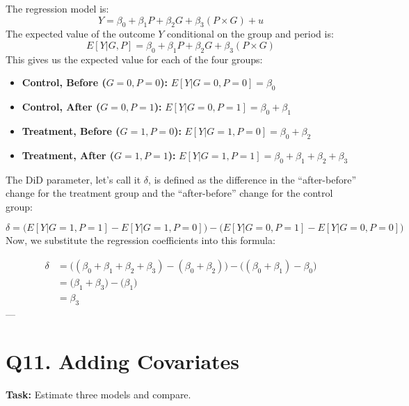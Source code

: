 \documentclass[
]{article}
\providecommand{\tightlist}{%
  \setlength{\itemsep}{0pt}\setlength{\parskip}{0pt}}
\begin{document}
The regression model is: \[
Y = \beta_0 + \beta_1 P + \beta_2 G + \beta_3 (P \times G) + u
\] The expected value of the outcome \(Y\) conditional on the group and
period is: \[
E[Y | G, P] = \beta_0 + \beta_1 P + \beta_2 G + \beta_3 (P \times G)
\] This gives us the expected value for each of the four groups:

\begin{itemize}
\tightlist
\item
  \textbf{Control, Before (\(G=0, P=0\)):} \(E[Y | G=0, P=0] = \beta_0\)
\item
  \textbf{Control, After (\(G=0, P=1\)):}
  \(E[Y | G=0, P=1] = \beta_0 + \beta_1\)
\item
  \textbf{Treatment, Before (\(G=1, P=0\)):}
  \(E[Y | G=1, P=0] = \beta_0 + \beta_2\)
\item
  \textbf{Treatment, After (\(G=1, P=1\)):}
  \(E[Y | G=1, P=1] = \beta_0 + \beta_1 + \beta_2 + \beta_3\)
\end{itemize}

The DiD parameter, let's call it \(\delta\), is defined as the
difference in the ``after-before'' change for the treatment group and
the ``after-before'' change for the control group:

\[
\delta = \Big( E[Y | G=1, P=1] - E[Y | G=1, P=0] \Big) - \Big( E[Y | G=0, P=1] - E[Y | G=0, P=0] \Big)
\] Now, we substitute the regression coefficients into this formula:

\begin{align*}
\delta &= \Big( (\beta_0 + \beta_1 + \beta_2 + \beta_3) - (\beta_0 + \beta_2) \Big) - \Big( (\beta_0 + \beta_1) - \beta_0 \Big) \\
&= \Big( \beta_1 + \beta_3 \Big) - \Big( \beta_1 \Big) \\
&= \beta_3
\end{align*} ---

\section{Q11. Adding Covariates}\label{q11.-adding-covariates}

\textbf{Task:} Estimate three models and compare.
\end{document}
